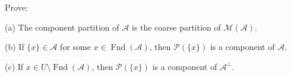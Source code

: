 Prove:

(a) The component partition of $\mathcal{A}$ is the coarse partition of $\mathcal{M}(\mathcal{A})$.

(b) If $\{x\} \in \mathcal{A}$ for some $x \in \operatorname{Fnd}(\mathcal{A})$, then $\mathcal{P}(\{x\})$ is a component of $\mathcal{A}$.

(c) If $x \in U \setminus \operatorname{Fnd}(\mathcal{A})$, then $\mathcal{P}(\{x\})$ is a component of $\mathcal{A}^{\perp}$.
